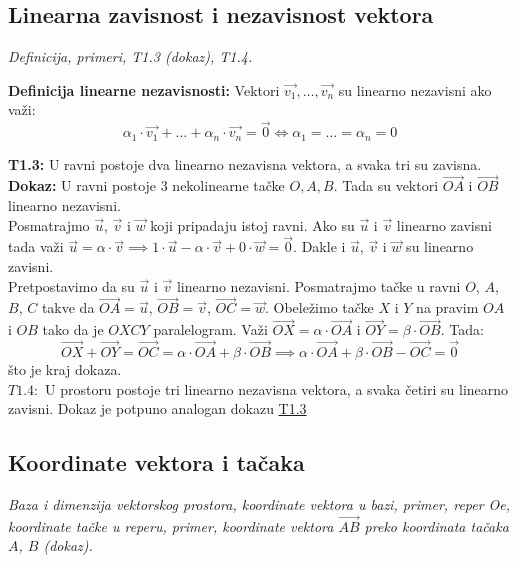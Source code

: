 \documentclass[12pt]{article}
\newcommand{\vek}[1]{\overrightarrow{#1}}
\begin{document}
\subsection{Linearna zavisnost i nezavisnost vektora}
\textit{Definicija, primeri, T1.3 (dokaz), T1.4.}\par

\vspace*{1cm}

\textbf{Definicija linearne nezavisnosti:} Vektori $\vek{v_1},\dotsc,\vek{v_n}$
su linearno nezavisni ako važi:
$$\alpha_1\cdot\vek{v_1}+\dotsc+\alpha_n\cdot\vek{v_n}=\vek{0} \iff \alpha_1=
    \dotsc=\alpha_n=0$$
\par

\textbf{T1.3:}\label{theorem:1.3} U ravni postoje dva linearno nezavisna
vektora, a svaka tri su zavisna.\\
\textbf{Dokaz:} U ravni postoje 3 nekolinearne tačke $O, A, B$. Tada su vektori
$\vek{OA}$ i $\vek{OB}$ linearno nezavisni.\\
Posmatrajmo $\vek{u}$, $\vek{v}$ i $\vek{w}$ koji pripadaju istoj ravni. Ako su
$\vek{u}$ i $\vek{v}$ linearno zavisni tada važi $\vek{u}=\alpha\cdot\vek{v}
    \implies 1\cdot\vek{u}-\alpha\cdot\vek{v}+0\cdot\vek{w}=\vek{0}$. Dakle i
$\vek{u}$, $\vek{v}$ i $\vek{w}$ su linearno zavisni.\\
Pretpostavimo da su $\vek{u}$ i $\vek{v}$ linearno nezavisni. Posmatrajmo tačke
u ravni $O$, $A$, $B$, $C$ takve da $\vek{OA}=\vek{u}$, $\vek{OB}=\vek{v}$,
$\vek{OC}=\vek{w}$. Obeležimo tačke $X$ i $Y$ na pravim $OA$ i $OB$ tako da je
$OXCY$ paralelogram. Važi $\vek{OX}=\alpha\cdot\vek{OA}$ i $\vek{OY}=\beta\cdot
    \vek{OB}$. Tada:
$$\vek{OX}+\vek{OY}=\vek{OC}=\alpha\cdot\vek{OA}+\beta\cdot\vek{OB} \implies
    \alpha\cdot\vek{OA}+\beta\cdot\vek{OB}-\vek{OC}=\vek{0}$$
što je kraj dokaza.\\
$T1.4:$ U prostoru postoje tri linearno nezavisna vektora, a svaka četiri su
linearno zavisni. Dokaz je potpuno analogan dokazu \hyperref[theorem:1.3]{T1.3}

\subsection{Koordinate vektora i tačaka}
\textit{Baza i dimenzija vektorskog prostora, koordinate vektora
    u bazi, primer, reper Oe, koordinate tačke u reperu,
    primer, koordinate vektora
    $\vek{AB}$ preko koordinata tačaka $A$, $B$ (dokaz).
}\par
\end{document}

